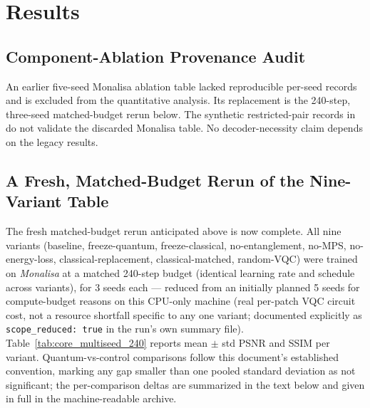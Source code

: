 \documentclass[11pt]{article}
\begin{document}
\section{Results}
\label{sec:results}

\subsection{Component-Ablation Provenance Audit}
\label{sec:component_provenance}
\begin{sloppypar}
An earlier five-seed Monalisa ablation table lacked reproducible per-seed records and is excluded from the quantitative analysis. Its replacement is the 240-step, three-seed matched-budget rerun below. The synthetic restricted-pair records in  do not validate the discarded Monalisa table. No decoder-necessity claim depends on the legacy results.
\end{sloppypar}

\subsection{A Fresh, Matched-Budget Rerun of the Nine-Variant Table}
\label{sec:core_multiseed_rerun}
The fresh matched-budget rerun anticipated above is now complete. All nine variants (baseline, freeze-quantum, freeze-classical, no-entanglement, no-MPS, no-energy-loss, classical-replacement, classical-matched, random-VQC) were trained on \textit{Monalisa} at a matched 240-step budget (identical learning rate and schedule across variants), for 3 seeds each --- reduced from an initially planned 5 seeds for compute-budget reasons on this CPU-only machine (real per-patch VQC circuit cost, not a resource shortfall specific to any one variant; documented explicitly as \texttt{scope\_reduced: true} in the run's own summary file). Table~\ref{tab:core_multiseed_240} reports mean $\pm$ std PSNR and SSIM per variant. Quantum-vs-control comparisons follow this document's established convention, marking any gap smaller than one pooled standard deviation as not significant; the per-comparison deltas are summarized in the text below and given in full in the machine-readable archive.
\end{document}
